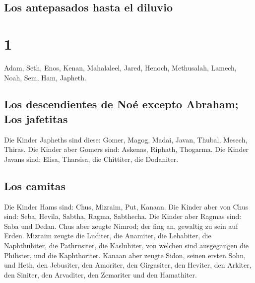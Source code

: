 \hypertarget{los-antepasados-hasta-el-diluvio}{%
\subsection{Los antepasados \hspace{0pt}\hspace{0pt}hasta el
diluvio}\label{los-antepasados-hasta-el-diluvio}}

\hypertarget{section}{%
\section{1}\label{section}}

 Adam, Seth, Enos,  Kenan, Mahalaleel,
Jared,  Henoch, Methusalah, Lamech,  Noah,
Sem, Ham, Japheth.

\hypertarget{los-descendientes-de-nouxe9-excepto-abraham-los-jafetitas}{%
\subsection{Los descendientes de Noé excepto Abraham; Los
jafetitas}\label{los-descendientes-de-nouxe9-excepto-abraham-los-jafetitas}}

 Die Kinder Japheths sind diese: Gomer, Magog, Madai,
Javan, Thubal, Mesech, Thiras.  Die Kinder aber Gomers
sind: Askenas, Riphath, Thogarma.  Die Kinder Javans sind:
Elisa, Tharsisa, die Chittiter, die Dodaniter.

\hypertarget{los-camitas}{%
\subsection{Los camitas}\label{los-camitas}}

 Die Kinder Hams sind: Chus, Mizraim, Put, Kanaan.
 Die Kinder aber von Chus sind: Seba, Hevila, Sabtha,
Ragma, Sabthecha. Die Kinder aber Ragmas sind: Saba und Dedan.
 Chus aber zeugte Nimrod; der fing an, gewaltig zu sein
auf Erden.  Mizraim zeugte die Luditer, die Anamiter, die
Lehabiter, die Naphthuhiter,  die Pathrusiter, die
Kasluhiter, von welchen sind ausgegangen die Philister, und die
Kaphthoriter.  Kanaan aber zeugte Sidon, seinen ersten
Sohn, und Heth,  den Jebusiter, den Amoriter, den
Girgasiter,  den Heviter, den Arkiter, den Siniter,
 den Arvaditer, den Zemariter und den Hamathiter.

